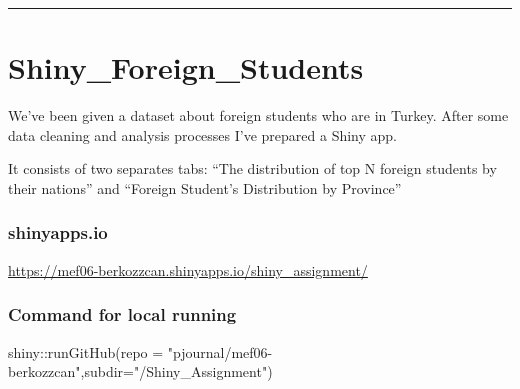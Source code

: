 \documentclass[
  letterpaper,
  DIV=11,
  numbers=noendperiod]{scrreprt}
\newenvironment{Shaded}{\begin{snugshade}}{\end{snugshade}}
\newcommand{\AttributeTok}[1]{\textcolor[rgb]{0.40,0.45,0.13}{#1}}
\newcommand{\FunctionTok}[1]{\textcolor[rgb]{0.28,0.35,0.67}{#1}}
\newcommand{\NormalTok}[1]{\textcolor[rgb]{0.00,0.23,0.31}{#1}}
\newcommand{\SpecialCharTok}[1]{\textcolor[rgb]{0.37,0.37,0.37}{#1}}
\newcommand{\StringTok}[1]{\textcolor[rgb]{0.13,0.47,0.30}{#1}}
\begin{document}
\begin{center}\rule{0.5\linewidth}{0.5pt}\end{center}


\hypertarget{shiny_foreign_students}{%
\chapter{Shiny\_Foreign\_Students}\label{shiny_foreign_students}}

We've been given a dataset about foreign students who are in Turkey.
After some data cleaning and analysis processes I've prepared a Shiny
app.

It consists of two separates tabs: ``The distribution of top N foreign
students by their nations'' and ``Foreign Student's Distribution by
Province''

\hypertarget{shinyapps.io}{%
\subsection{shinyapps.io}\label{shinyapps.io}}

\url{https://mef06-berkozzcan.shinyapps.io/shiny_assignment/}

\hypertarget{command-for-local-running}{%
\subsection{Command for local running}\label{command-for-local-running}}

\begin{Shaded}
\begin{Highlighting}[]
\NormalTok{shiny}\SpecialCharTok{::}\FunctionTok{runGitHub}\NormalTok{(}\AttributeTok{repo =} \StringTok{"pjournal/mef06{-}berkozzcan"}\NormalTok{,}\AttributeTok{subdir=}\StringTok{"/Shiny\_Assignment"}\NormalTok{)}
\end{Highlighting}
\end{Shaded}
\end{document}
